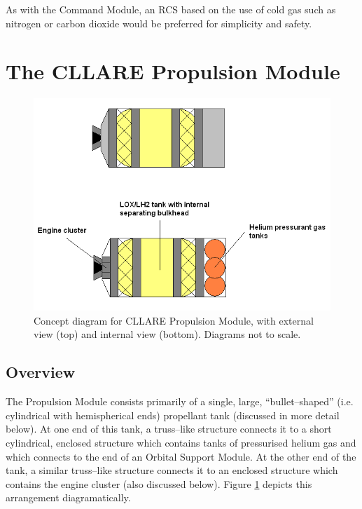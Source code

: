\documentclass{report}
\begin{document}
As with the Command Module, an RCS based on the use of cold gas such as nitrogen or carbon dioxide would be preferred for simplicity and safety.


\section{The CLLARE Propulsion Module}

\begin{figure}[h]
\centering
\includegraphics[scale=0.6]{images/cllare_pm_concept}
\caption{Concept diagram for CLLARE Propulsion Module, with external view (top) and internal view (bottom).  Diagrams not to scale.}
\label{fig:pm}
\end{figure}

\subsection{Overview}

The Propulsion Module consists primarily of a single, large, ``bullet--shaped'' (i.e. cylindrical with hemispherical ends) propellant tank (discussed in more detail below).  At one end of this tank, a truss--like structure connects it to a short cylindrical, enclosed structure which contains tanks of pressurised helium gas and which connects to the end of an Orbital Support Module.  At the other end of the tank, a similar truss--like structure connects it to an enclosed structure which contains the engine cluster (also discussed below).  Figure \ref{fig:pm} depicts this arrangement diagramatically.
\end{document}
